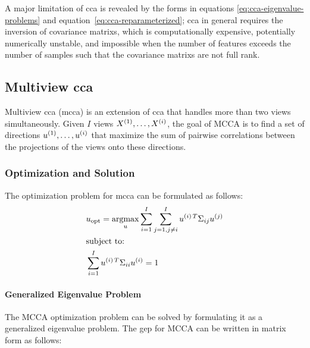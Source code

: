 A major limitation of \acrshort{cca} is revealed by the forms in equations \ref{eq:cca-eigenvalue-problems} and equation~\ref{eq:cca-reparameterized}; \acrshort{cca} in general requires the inversion of  \glspl{covariance matrix}, which is computationally expensive, potentially numerically unstable, and impossible when the number of features exceeds the number of samples such that the  \glspl{covariance matrix} are not full rank.

\subsection{Multiview \acrshort{cca}}

Multiview \acrshort{cca} (\acrshort{mcca}) is an extension of \acrshort{cca} that handles more than two \gls{views} simultaneously. Given $I$ \gls{views} $X^{(1)}, \dots, X^{(i)}$, the goal of MCCA is to find a set of directions $u^{(1)}, \dots, u^{(i)}$ that maximize the sum of pairwise correlations between the projections of the \gls{views} onto these directions.
\subsubsection{Optimization and Solution}

The optimization problem for \acrshort{mcca} can be formulated as follows:
\begin{align}
    & u_{\text{opt}} = \underset{u}{\mathrm{argmax}} \sum_{i=1}^{I} \sum_{j=1, j \neq i}^{I} u^{(i)\,T} \Sigma_{ij} u^{(j)} \\
    & \text{subject to:} \notag                                                                                               \\
    & \sum_{i=1}^{I} u^{(i)\,T} \Sigma_{ii} u^{(i)} = 1 \notag
\end{align}

\paragraph{Generalized Eigenvalue Problem}

The MCCA optimization problem can be solved by formulating it as a generalized eigenvalue problem. The \acrshort{gep} for MCCA can be written in matrix form as follows:

